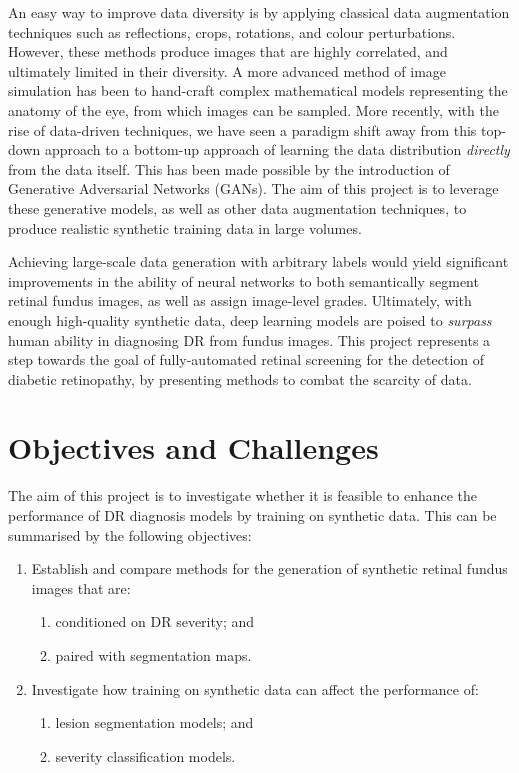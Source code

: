 An easy way to improve data diversity is by applying classical data augmentation techniques such as reflections, crops, rotations, and colour perturbations.
However, these methods produce images that are highly correlated, and ultimately limited in their diversity.
A more advanced method of image simulation has been to hand-craft complex mathematical models representing the anatomy of the eye, from which images can be sampled.
More recently, with the rise of data-driven techniques, we have seen a paradigm shift away from this top-down approach to a bottom-up approach of learning the data distribution \emph{directly} from the data itself.
This has been made possible by the introduction of Generative Adversarial Networks (GANs).
The aim of this project is to leverage these generative models, as well as other data augmentation techniques, to produce realistic synthetic training data in large volumes.

Achieving large-scale data generation with arbitrary labels would yield significant improvements in the ability of neural networks to both semantically segment retinal fundus images, as well as assign image-level grades.
Ultimately, with enough high-quality synthetic data, deep learning models are poised to \emph{surpass} human ability in diagnosing DR from fundus images.
This project represents a step towards the goal of fully-automated retinal screening for the detection of diabetic retinopathy, by presenting methods to combat the scarcity of data.

\section{Objectives and Challenges}

The aim of this project is to investigate whether it is feasible to enhance the performance of DR diagnosis models by training on synthetic data.
This can be summarised by the following objectives:

\begin{enumerate}
    \item Establish and compare methods for the generation of synthetic retinal fundus images that are:
    \begin{enumerate}
        \item conditioned on DR severity; and
        \item paired with segmentation maps. 
    \end{enumerate}
    \item Investigate how training on synthetic data can affect the performance of:
    \begin{enumerate}
        \item lesion segmentation models; and
        \item severity classification models.
    \end{enumerate}
\end{enumerate}

